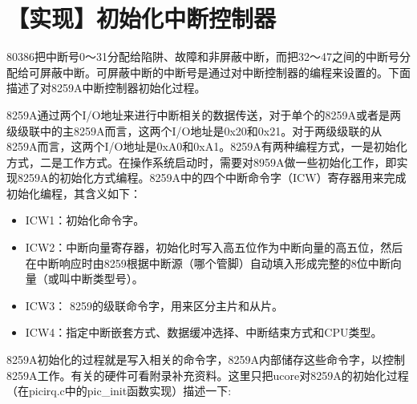 \section{【实现】初始化中断控制器}\label{ux5b9eux73b0ux521dux59cbux5316ux4e2dux65adux63a7ux5236ux5668}

80386把中断号0～31分配给陷阱、故障和非屏蔽中断，而把32～47之间的中断号分配给可屏蔽中断。可屏蔽中断的中断号是通过对中断控制器的编程来设置的。下面描述了对8259A中断控制器初始化过程。

8259A通过两个I/O地址来进行中断相关的数据传送，对于单个的8259A或者是两级级联中的主8259A而言，这两个I/O地址是0x20和0x21。对于两级级联的从8259A而言，这两个I/O地址是0xA0和0xA1。8259A有两种编程方式，一是初始化方式，二是工作方式。在操作系统启动时，需要对8959A做一些初始化工作，即实现8259A的初始化方式编程。8259A中的四个中断命令字（ICW）寄存器用来完成初始化编程，其含义如下：

\begin{itemize}
\item
  ICW1：初始化命令字。
\item
  ICW2：中断向量寄存器，初始化时写入高五位作为中断向量的高五位，然后在中断响应时由8259根据中断源（哪个管脚）自动填入形成完整的8位中断向量（或叫中断类型号）。
\item
  ICW3： 8259的级联命令字，用来区分主片和从片。
\item
  ICW4：指定中断嵌套方式、数据缓冲选择、中断结束方式和CPU类型。
\end{itemize}

8259A初始化的过程就是写入相关的命令字，8259A内部储存这些命令字，以控制8259A工作。有关的硬件可看附录补充资料。这里只把ucore对8259A的初始化过程（在picirq.c中的pic\_init函数实现）描述一下:

